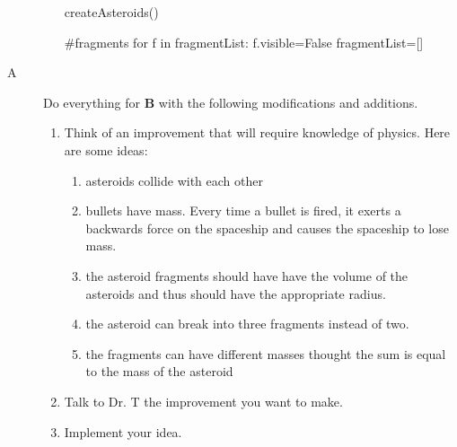 \begin{description}
\begin{enumerate}
\begin{myvpython}
    createAsteroids()
    
    #fragments
    for f in fragmentList:
        f.visible=False
    fragmentList=[]
  \end{myvpython}

	
\end{enumerate}

\item[A] Do everything for {\bf B} with the following modifications and additions.

\begin{enumerate}
	\item Think of an improvement that will require knowledge of physics. Here are some ideas: 
	\begin{enumerate}
		\item asteroids collide with each other
		\item bullets have mass. Every time a bullet is fired, it exerts a backwards force on the spaceship and causes the spaceship to lose mass.
		\item the asteroid fragments should have have the volume of the asteroids and thus should have the appropriate radius.
		\item the asteroid can break into three fragments instead of two.
		\item the fragments can have different masses thought the sum is equal to the mass of the asteroid
	\end{enumerate}
	\item Talk to Dr. T the improvement you want to make.
	\item Implement your idea.
\end{enumerate}


\end{description}

